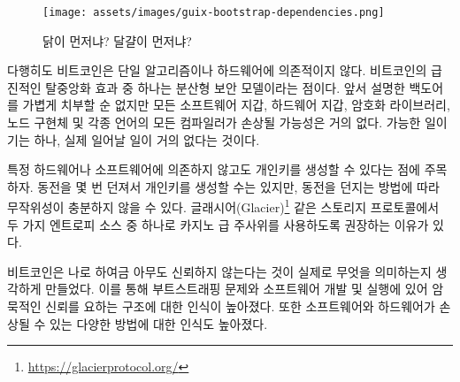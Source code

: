 \begin{figure}
	\texttt{[image: assets/images/guix-bootstrap-dependencies.png]}
	\caption{닭이 먼저냐? 달걀이 먼저냐?}
	\label{fig:guix-bootstrap-dependencies}
\end{figure}

\begin{comment}
	Luckily, Bitcoin doesn't rely on a single algorithm or piece of
	hardware. One effect of Bitcoin's radical decentralization is a
	distributed security model. Although the backdoors described above are
	not to be taken lightly, it is unlikely that every software wallet,
	every hardware wallet, every cryptographic library, every node
	implementation, and every compiler of every language is compromised.
	Possible, but highly unlikely.
\end{comment}
다행히도 비트코인은 단일 알고리즘이나 하드웨어에 의존적이지 않다.
비트코인의 급진적인 탈중앙화 효과 중 하나는 분산형 보안 모델이라는 점이다. 
앞서 설명한 백도어를 가볍게 치부할 순 없지만 모든 소프트웨어 지갑, 하드웨어 지갑, 암호화 라이브러리, 노드 구현체 및 각종 언어의 모든 컴파일러가 손상될 가능성은 거의 없다.
가능한 일이기는 하나, 실제 일어날 일이 거의 없다는 것이다.

\begin{comment}
	Note that you can generate a private key without relying on any computational
	hardware or software. You can flip a coin~\cite{antonopoulos2014mastering} a
	couple of times, although depending on your coin and tossing style this source
	of randomness might not be sufficiently random. There is a reason why storage
	protocols like Glacier\footnote{\url{https://glacierprotocol.org/}} advise to
	use casino-grade dice as one of two sources of entropy.
\end{comment}
특정 하드웨어나 소프트웨어에 의존하지 않고도 개인키를 생성할 수 있다는 점에 주목하자.
동전을 몇 번 던져서 개인키를 생성할 수는 있지만\cite{antonopoulos2014mastering}, 동전을 던지는 방법에 따라 무작위성이 충분하지 않을 수 있다.
글래시어(Glacier)\footnote{\url{https://glacierprotocol.org/}} 같은 스토리지 프로토콜에서
두 가지 엔트로피 소스 중 하나로 카지노 급 주사위를 사용하도록 권장하는 이유가 있다.

\begin{comment}
	Bitcoin forced me to reflect on what trusting nobody actually entails.
	It raised my awareness of the bootstrapping problem, and the implicit
	chain-of-trust in developing and running software. It also raised my
	awareness of the many ways in which software and hardware can be
	compromised
\end{comment}
비트코인은 나로 하여금 아무도 신뢰하지 않는다는 것이 실제로 무엇을 의미하는지 생각하게 만들었다. 
이를 통해 부트스트래핑 문제와 소프트웨어 개발 및 실행에 있어 암묵적인 신뢰를 요하는 구조에 대한 인식이 높아졌다.
또한 소프트웨어와 하드웨어가 손상될 수 있는 다양한 방법에 대한 인식도 높아졌다.


